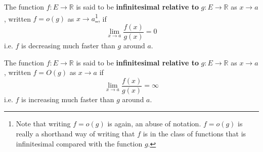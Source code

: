   \begin{definition}
    \label{def:little-o-notation}
		The function $f: E \to \mathbb{R}$ is said to be \textbf{infinitesimal relative to}  $g: E \to \mathbb{R}$ as $x \to a$, written $f = o(g)$ as $x \to a$\footnote{Note that writing $f = o(g)$ is again, an abuse of notation. $f = o(g)$ is really a shorthand way of writing that $f$ is in the class of functions that is infinitesimal compared with the function $g$.}, if 
    \begin{equation}
      \lim_{x \to a} \frac{f(x)}{g(x)} = 0
    \end{equation}
		i.e. $f$ is decreasing much faster than $g$ around $a$.  
  \end{definition}

  \begin{definition}
    \label{def:big-o-notation}
		The function $f: E \to \mathbb{R}$ is said to be \textbf{infinitesimal relative to}  $g: E \to \mathbb{R}$ as $x \to a$, written $f = O(g)$ as $x \to a$ if 
    \begin{equation}
      \lim_{x \to a} \frac{f(x)}{g(x)} = \infty
    \end{equation}
		i.e. $f$ is increasing much faster than $g$ around $a$. 
  \end{definition}

